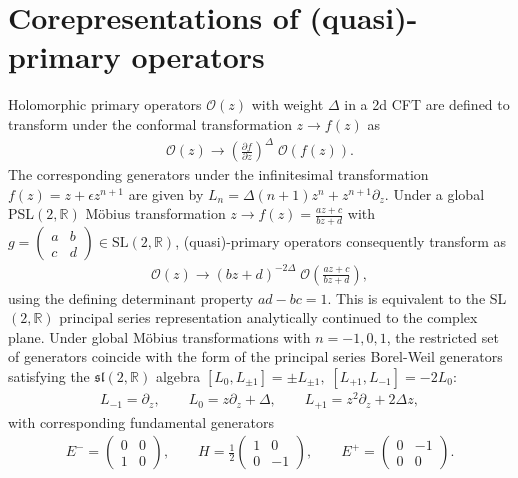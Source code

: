 \documentclass[a4paper,titlepage,12pt]{article}
\numberwithin{equation}{section}
\begin{document}
\section{Corepresentations of (quasi)-primary operators}\label{app:cft}
Holomorphic primary operators $\mathcal{O}(z)$ with weight $\Delta$ in a 2d CFT are defined to transform under the conformal transformation $z\rightarrow f(z)$ as
\begin{align}
    \mathcal{O}(z)\rightarrow \left(\frac{\partial f}{\partial z}\right)^\Delta \;\mathcal{O}(f(z)).
\end{align}
The corresponding generators under the infinitesimal transformation $f(z)=z+\epsilon z^{n+1}$ are given by $L_n=\Delta(n+1) z^n+z^{n+1}\partial_z$. Under a global PSL$(2,\mathbb{R})$ Möbius transformation $z\rightarrow f(z)=\frac{az+c}{bz+d}$ with $g=\begin{pmatrix}
    a&b\\c&d
\end{pmatrix}\in \text{SL}(2,\mathbb{R})$, (quasi)-primary operators consequently transform as 
\begin{align}
\label{eq:principalseries}
    \mathcal{O}(z)\rightarrow \left(bz+d\right)^{-2\Delta} \;\mathcal{O}\left(\frac{az+c}{bz+d}\right),
\end{align}
using the defining determinant property $ad-bc=1$. This is equivalent to the SL$(2,\mathbb{R})$ principal series representation analytically continued to the complex plane. Under global Möbius transformations with $n=-1,0,1$, the restricted set of generators coincide with the form of the principal series Borel-Weil generators satisfying the $\mathfrak{sl}(2,\mathbb{R})$ algebra $[L_0,L_{\pm1}]=\pm L_{\pm1}, \;[L_{+1},L_{-1}]=-2L_0$: \begin{align}\label{eq:BorelWeil}
    L_{-1}=\partial_z, \qquad L_{0}=z\partial_z+\Delta , \qquad L_{+1}=z^2\partial_z+2\Delta z,
\end{align} 
with corresponding fundamental generators 
\begin{align}\label{eq:fundamentalgenerators}
    E^-=\begin{pmatrix}
        0&0\\1&0
    \end{pmatrix}, \qquad H=\frac{1}{2}\begin{pmatrix}
        1&0\\0&-1
    \end{pmatrix}, \qquad E^+=\begin{pmatrix}
        0&-1\\0&0
    \end{pmatrix}.
\end{align} 
\end{document}
